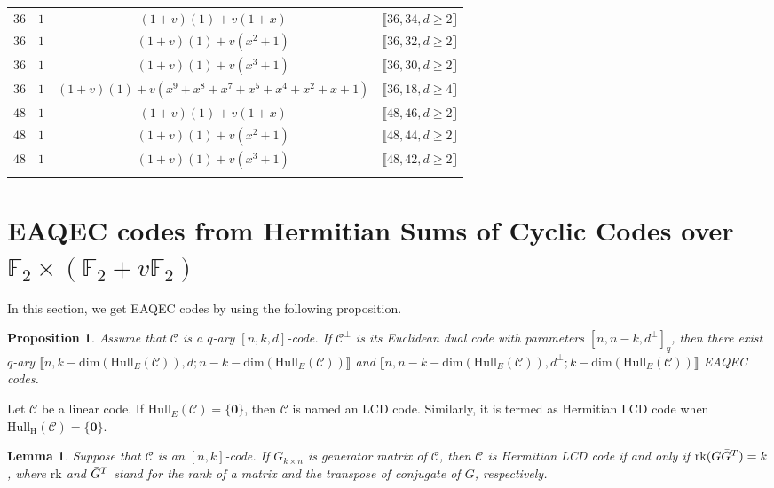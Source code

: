 \documentclass[pdflatex,sn-mathphys-num]{sn-jnl}%
\theoremstyle{thmstyleone}%
\newtheorem{proposition}[theorem]{Proposition}%
\newtheorem{lemma}[theorem]{Lemma}
\theoremstyle{thmstyletwo}%
\theoremstyle{thmstylethree}%
\begin{document}
\begin{table}[!ht]
\begin{tabular}{lccc}
$36$ & $1$ & $(1+v)(1)+v(1+x)$ & $\llbracket36,34,d\geq 2\rrbracket$ \\
$36$ & $1$ & $(1+v)(1)+v(x^{2}+1)$ & $\llbracket36,32,d\geq 2\rrbracket$ \\
$36$ & $1$ & $(1+v)(1)+v(x^{3}+1)$ & $\llbracket36,30,d\geq 2\rrbracket$ \\
$36$ & $1$ & $(1+v)(1)+v(x^{9}+x^{8}+x^{7}+x^{5}+x^{4}+x^{2}+x+1)$ & $%
\llbracket36,18,d\geq 4\rrbracket$ \\
$48$ & $1$ & $(1+v)(1)+v(1+x)$ & $\llbracket48,46,d\geq 2\rrbracket$ \\
$48$ & $1$ & $(1+v)(1)+v(x^{2}+1)$ & $\llbracket48,44,d\geq 2\rrbracket$ \\
$48$ & $1$ & $(1+v)(1)+v(x^{3}+1)$ & $\llbracket48,42,d\geq 2\rrbracket$ \\
\botrule
\end{tabular}
\end{table}

\section{EAQEC codes from Hermitian Sums of Cyclic Codes over $\mathbb{F}_2 \times (\mathbb{F}_2+v\mathbb{F}_2)$}
\label{sec5}
In this section, we get EAQEC codes by using the following proposition.

\begin{proposition}\label{eaqec}\cite{eaqec}
Assume that $\mathcal{C}$ is a $q$-ary $[n,k,d]$-code. If $\mathcal{C}^{\perp}$ is its Euclidean dual code with parameters $[n,n - k,d^{\perp}]_q$, then there exist $q$-ary $\llbracket n,k -\mathrm{dim}(\mathrm{Hull}_{E}(\mathcal{C})),d;n-k-\mathrm{dim}(\mathrm{Hull}_{E}(\mathcal{C}))\rrbracket $ and $\llbracket n,n-k-\mathrm{dim}(\mathrm{Hull}_{E}(\mathcal{C})),d^\perp;k-\mathrm{dim}(\mathrm{Hull}_{E}(\mathcal{C}))\rrbracket $
 EAQEC codes.
\end{proposition}

\noindent Let $\mathcal{C}$ be a linear code. If $\mathrm{Hull}_{E}(\mathcal{C})=\{\mathbf{0}\}$, then $\mathcal{C}$ is named an LCD code. Similarly, it is termed as Hermitian LCD code when $\mathrm{Hull_H}(\mathcal{C})=\{\mathbf{0}\}$.

\begin{lemma}\cite{lcd}
Suppose that $\mathcal{C}$ is an $[n,k]$-code. If $G_{k\times n}$ is generator matrix of $\mathcal{C}$, then $\mathcal{C}$ is Hermitian LCD code if and only if $\mathrm{rk}(G\Bar{G}^T)=k$, where $\mathrm{rk}$ and $\Bar{G}^T$ stand for the rank of a matrix and the transpose of conjugate of $G$, respectively.
\end{lemma}
\end{document}
